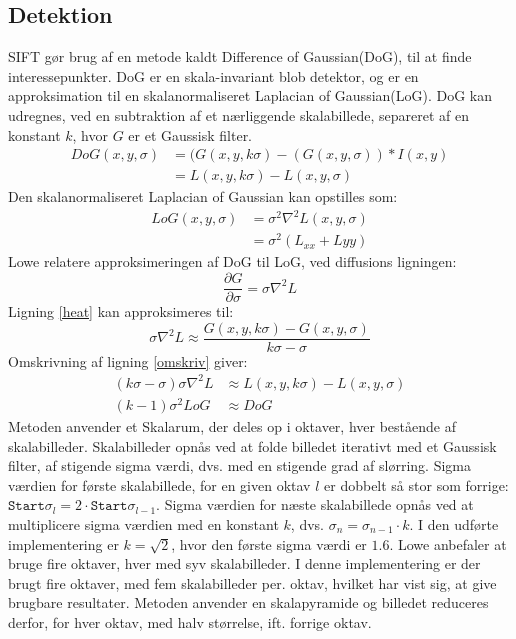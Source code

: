 \subsection{Detektion}
SIFT gør brug af en metode kaldt Difference of Gaussian(DoG), til at finde interessepunkter. DoG er en skala-invariant blob detektor, og er en approksimation til en skalanormaliseret Laplacian of Gaussian(LoG). DoG kan udregnes, ved en subtraktion af et nærliggende skalabillede, separeret af en konstant $k$, hvor $G$ er et Gaussisk filter.
\begin{equation}
\begin{split}
DoG(x,y,\sigma) &= (G(x,y,k\sigma)-(G(x,y,\sigma))\ast I(x,y) \\
           &= L(x,y,k \sigma)-L(x,y,\sigma)
\end{split}
\label{dog}
\end{equation}
Den skalanormaliseret Laplacian of Gaussian kan opstilles som:
\begin{equation}
\begin{split}
LoG(x,y,\sigma)&=\sigma^2\nabla^2L(x,y,\sigma) \\
&= \sigma^2(L_{xx}+L{yy})
\end{split}
\end{equation}
Lowe relatere approksimeringen af DoG til LoG, ved diffusions ligningen:
\begin{equation}
\dfrac{\partial G}{\partial \sigma} = \sigma \nabla^2L
\label{heat}
\end{equation}
Ligning \eqref{heat} kan approksimeres til:
\begin{equation}
\sigma \nabla^2L \approx \frac{G(x,y,k\sigma) - G(x,y,\sigma)}{k\sigma-\sigma}
\label{omskriv}
\end{equation}
Omskrivning af ligning \eqref{omskriv} giver:
\begin{equation}
\begin{split}
(k\sigma-\sigma)\sigma\nabla^2L &\approx L(x,y,k\sigma)-L(x,y,\sigma) \\
(k-1)\sigma^2LoG &\approx DoG
\end{split}
\end{equation}
Metoden anvender et Skalarum, der deles op i oktaver, hver bestående af skalabilleder. Skalabilleder opnås ved at folde billedet iterativt med et Gaussisk filter, af stigende sigma værdi, dvs. med en stigende grad af slørring. Sigma værdien for første skalabillede, for en given oktav $l$ er dobbelt så stor som forrige: $\texttt{Start} \sigma_l = 2 \cdot \texttt{Start} \sigma_{l-1}$. Sigma værdien for næste skalabillede opnås ved at multiplicere sigma værdien med en konstant $k$, dvs. $\sigma_n = \sigma_{n-1} \cdot k$. I den udførte implementering er $k=\sqrt{2}$, hvor den første sigma værdi er $1.6$. Lowe anbefaler at bruge fire oktaver, hver med syv skalabilleder. I denne implementering er der brugt fire oktaver, med fem skalabilleder per. oktav, hvilket har vist sig, at give brugbare resultater. Metoden anvender en skalapyramide og billedet reduceres derfor, for hver oktav, med halv størrelse, ift. forrige oktav. \\ 
